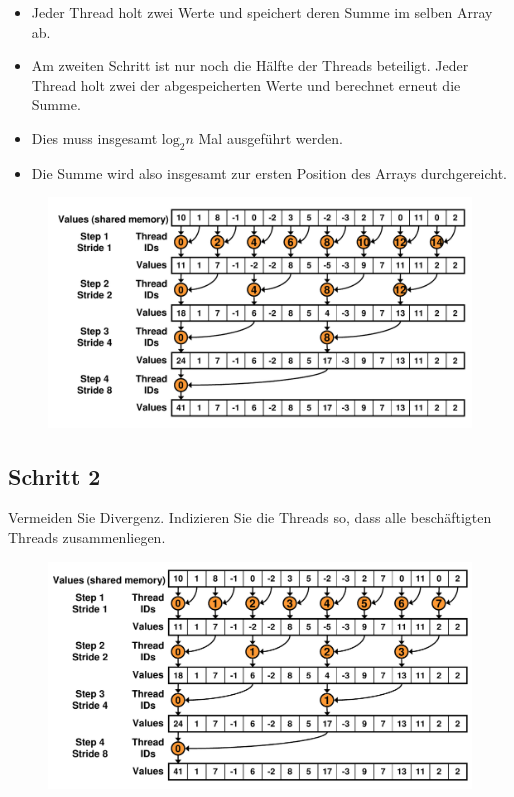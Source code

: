 \documentclass[headsepline=3pt,headinclude=true,12pt,oneside]{scrartcl}
\begin{document}
		\begin{itemize}
			\item Jeder Thread holt zwei Werte und speichert deren Summe im selben Array ab.
			\item Am zweiten Schritt ist nur noch die Hälfte der Threads beteiligt. Jeder Thread holt zwei der abgespeicherten Werte und berechnet erneut die Summe.
			\item Dies muss insgesamt $\text{log}_2 n$ Mal ausgeführt werden.
			\item Die Summe wird also insgesamt zur ersten Position des Arrays durchgereicht.
		\end{itemize}
		
		\begin{figure}[h]
			\centering
			\includegraphics[scale=0.4]{1.png}		
		\end{figure}
		
		\subsection{Schritt 2}
		Vermeiden Sie Divergenz. Indizieren Sie die Threads so, dass alle beschäftigten Threads zusammenliegen.
		
		\begin{figure}[h]
			\centering
			\includegraphics[scale=0.4]{2.png}		
		\end{figure}
		
\end{document}
